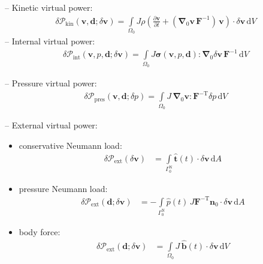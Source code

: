 \documentclass[a4paper,12pt]{report}
\newcommand{\bs}[1]{\boldsymbol{#1}}
\newcommand{\Om}{\mathit{\Omega}}
\newcommand{\Gm}{\mathit{\Gamma}}
\begin{document}
-- Kinetic virtual power:
\begin{align}
\delta \mathcal{P}_{\mathrm{kin}}(\bs{v},\bs{d};\delta\bs{v}) = \int\limits_{\Om_0} J \rho\left(\frac{\partial\bs{v}}{\partial t} + (\bs{\nabla}_{0}\bs{v}\,\bs{F}^{-1})\,\bs{v}\right) \cdot \delta\bs{v} \,\mathrm{d}V
\end{align}
-- Internal virtual power:
\begin{align}
\delta \mathcal{P}_{\mathrm{int}}(\bs{v},p,\bs{d};\delta\bs{v}) = 
\int\limits_{\Om_0} J\bs{\sigma}(\bs{v},p,\bs{d}) : \bs{\nabla}_{0} \delta\bs{v}\,\bs{F}^{-1} \,\mathrm{d}V
\end{align}

-- Pressure virtual power:
\begin{align}
\delta \mathcal{P}_{\mathrm{pres}}(\bs{v},\bs{d};\delta p) = 
\int\limits_{\Om_0} J\,\bs{\nabla}_{0}\bs{v} : \bs{F}^{-\mathrm{T}}\delta p\,\mathrm{d}V
\end{align}

-- External virtual power:\\
\begin{itemize}
\item conservative Neumann load:
\begin{align}
\delta \mathcal{P}_{\mathrm{ext}}(\delta\bs{v}) &= \int\limits_{\Gm_0^{\mathrm{N}}} \hat{\bs{t}}(t) \cdot \delta\bs{v} \,\mathrm{d}A \label{eq:deltaPext_neumann_ale}
\end{align}
\item pressure Neumann load:
\begin{align}
\delta \mathcal{P}_{\mathrm{ext}}(\bs{d};\delta\bs{v}) &= -\int\limits_{\Gm_0^{\mathrm{N}}} \hat{p}(t)\,J\bs{F}^{-\mathrm{T}}\bs{n}_{0} \cdot \delta\bs{v} \,\mathrm{d}A \label{eq:deltaPext_neumann_ale_true}
\end{align}
\item body force:
\begin{align}
\delta \mathcal{P}_{\mathrm{ext}}(\bs{d};\delta\bs{v}) &= \int\limits_{\Om_0} J\,\hat{\bs{b}}(t) \cdot \delta\bs{v} \,\mathrm{d}V \label{eq:deltaPext_body_ale}
\end{align}
\end{itemize}
\end{document}
